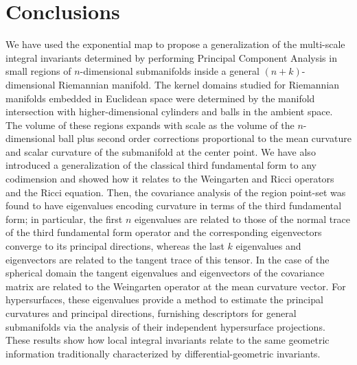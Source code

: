 \documentclass[letterpaper, reqno, 11pt]{amsart}
\theoremstyle{definition}
\theoremstyle{remark}
\numberwithin{equation}{section}
\begin{document}


\section{Conclusions}
\label{sec:conclusions}

We have used the exponential map to propose a generalization of the multi-scale integral invariants determined by performing Principal Component Analysis in small regions of $n$-dimensional submanifolds inside a general $(n+k)$-dimensional Riemannian manifold. The kernel domains studied for Riemannian manifolds embedded in Euclidean space were determined by the manifold intersection with higher-dimensional cylinders and balls in the ambient space. The volume of these regions expands with scale as the volume of the $n$-dimensional ball plus second order corrections proportional to the mean curvature and scalar curvature of the submanifold at the center point. We have also introduced a generalization of the classical third fundamental form to any codimension and showed how it relates to the Weingarten and Ricci operators and the Ricci equation. Then, the covariance analysis of the region point-set was found to have eigenvalues encoding curvature in terms of the third fundamental form; in particular, the first $n$ eigenvalues are related to those of the normal trace of the third fundamental form operator and the corresponding eigenvectors converge to its principal directions, whereas the last $k$ eigenvalues and eigenvectors are related to the tangent trace of this tensor. In the case of the spherical domain the tangent eigenvalues and eigenvectors of the covariance matrix are related to the Weingarten operator at the mean curvature vector. For hypersurfaces, these eigenvalues provide a method to estimate the principal curvatures and principal directions, furnishing descriptors for general submanifolds via the analysis of their independent hypersurface projections. These results show how local integral invariants relate to the same geometric information traditionally characterized by differential-geometric invariants.
\end{document}
